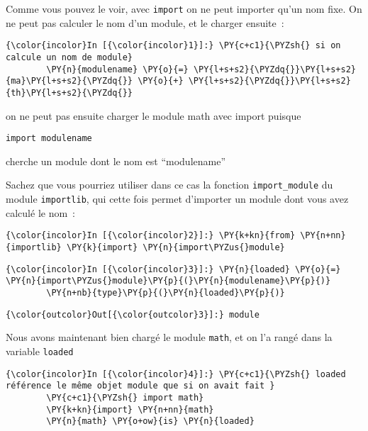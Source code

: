     Comme vous pouvez le voir, avec \texttt{import} on ne peut importer
qu'un nom fixe. On ne peut pas calculer le nom d'un module, et le
charger ensuite~:

    \begin{Verbatim}[commandchars=\\\{\}]
{\color{incolor}In [{\color{incolor}1}]:} \PY{c+c1}{\PYZsh{} si on calcule un nom de module}
        \PY{n}{modulename} \PY{o}{=} \PY{l+s+s2}{\PYZdq{}}\PY{l+s+s2}{ma}\PY{l+s+s2}{\PYZdq{}} \PY{o}{+} \PY{l+s+s2}{\PYZdq{}}\PY{l+s+s2}{th}\PY{l+s+s2}{\PYZdq{}} 
\end{Verbatim}


    on ne peut pas ensuite charger le module math avec import puisque

\begin{verbatim}
import modulename
\end{verbatim}

cherche un module dont le nom est ``modulename''

    Sachez que vous pourriez utiliser dans ce cas la fonction
\texttt{import\_module} du module \texttt{importlib}, qui cette fois
permet d'importer un module dont vous avez calculé le nom~:

    \begin{Verbatim}[commandchars=\\\{\}]
{\color{incolor}In [{\color{incolor}2}]:} \PY{k+kn}{from} \PY{n+nn}{importlib} \PY{k}{import} \PY{n}{import\PYZus{}module}
\end{Verbatim}


    \begin{Verbatim}[commandchars=\\\{\}]
{\color{incolor}In [{\color{incolor}3}]:} \PY{n}{loaded} \PY{o}{=} \PY{n}{import\PYZus{}module}\PY{p}{(}\PY{n}{modulename}\PY{p}{)}
        \PY{n+nb}{type}\PY{p}{(}\PY{n}{loaded}\PY{p}{)}
\end{Verbatim}


\begin{Verbatim}[commandchars=\\\{\}]
{\color{outcolor}Out[{\color{outcolor}3}]:} module
\end{Verbatim}
            
    Nous avons maintenant bien chargé le module \texttt{math}, et on l'a
rangé dans la variable \texttt{loaded}

    \begin{Verbatim}[commandchars=\\\{\}]
{\color{incolor}In [{\color{incolor}4}]:} \PY{c+c1}{\PYZsh{} loaded référence le même objet module que si on avait fait }
        \PY{c+c1}{\PYZsh{} import math}
        \PY{k+kn}{import} \PY{n+nn}{math}
        \PY{n}{math} \PY{o+ow}{is} \PY{n}{loaded}
\end{Verbatim}


